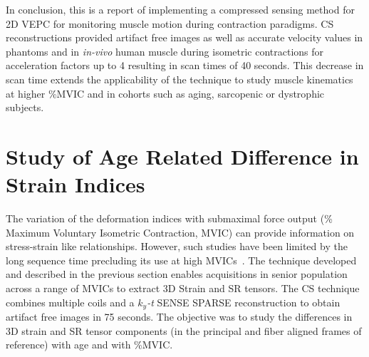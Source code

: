 In conclusion, this is a report of implementing a compressed sensing method for 2D VEPC for monitoring muscle motion during contraction paradigms. 
CS reconstructions provided artifact free images as well as accurate velocity values in phantoms and in \textit{in-vivo} human muscle during isometric contractions for acceleration factors up to 4 resulting in scan times of 40 seconds. 
This decrease in scan time extends the applicability of the technique to study muscle kinematics at higher \%MVIC and in cohorts such as aging, sarcopenic or dystrophic subjects.
\section{Study of Age Related Difference in Strain Indices}
\label{sec: CS_SRYO}
The variation of the deformation indices with submaximal force output (\% Maximum Voluntary Isometric Contraction, MVIC) can provide information on stress-strain like relationships. 
However, such studies have been limited by the long sequence time precluding its use at high MVICs~\cite{Malis:2018fr}. 
The technique developed and described in the previous section enables acquisitions in senior population across a range of MVICs to extract 3D Strain and SR tensors. 
The CS technique combines multiple coils and a $k_y$\textit{-t} SENSE SPARSE reconstruction to obtain artifact free images in 75 seconds. 
The objective was to study the differences in 3D strain and SR tensor components (in the principal and fiber aligned frames of reference) with age and with \%MVIC.

